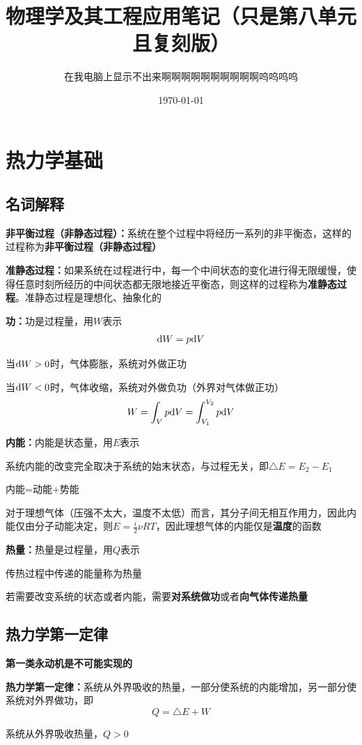 \documentclass[12pt, a4paper, twoside]{ctexbook}
\title{{\Huge{\textbf{物理学及其工程应用笔记（只是第八单元且复刻版）}}}}
\author{在我电脑上显示不出来啊啊啊啊啊啊啊啊啊啊呜呜呜呜}
\date{\today}
\begin{document}
\pagestyle{plain}
	
	\newpage
    \tableofcontents
    \setcounter{page}{2}



\chapter*{热力学基础}


\renewcommand\thesection{\arabic {section}}
\section{名词解释}
\textbf{非平衡过程（非静态过程）：}系统在整个过程中将经历一系列的非平衡态，这样的过程称为\textbf{非平衡过程（非静态过程）}

\textbf{准静态过程：}如果系统在过程进行中，每一个中间状态的变化进行得无限缓慢，使得任意时刻所经历的中间状态都无限地接近平衡态，则这样的过程称为\textbf{准静态过程}。准静态过程是理想化、抽象化的

\textbf{功：}功是过程量，用$W$表示
$$
{\rm d}W=p{\rm d}V
$$

当${\rm d}W>0$时，气体膨胀，系统对外做正功

当${\rm d}W<0$时，气体收缩，系统对外做负功（外界对气体做正功）
$$
W=\int_V{p{\rm d}V}=\int_{V_1}^{V_2}{p{\rm d}V}
$$

\textbf{内能：}内能是状态量，用$E$表示

系统内能的改变完全取决于系统的始末状态，与过程无关，即$\bigtriangleup E=E_2-E_1$

内能=动能+势能

对于理想气体（压强不太大，温度不太低）而言，其分子间无相互作用力，因此内能仅由分子动能决定，则$E=\frac{i}{2}\nu RT$，因此理想气体的内能仅是\textbf{温度}的函数

\textbf{热量：}热量是过程量，用$Q$表示

传热过程中传递的能量称为热量

若需要改变系统的状态或者内能，需要\textbf{对系统做功}或者\textbf{向气体传递热量}

\section{热力学第一定律}
\textbf{第一类永动机是不可能实现的}

\textbf{热力学第一定律：}系统从外界吸收的热量，一部分使系统的内能增加，另一部分使系统对外界做功，即
$$
Q=\bigtriangleup E+W
$$

系统从外界吸收热量，$Q>0$
\end{document}
